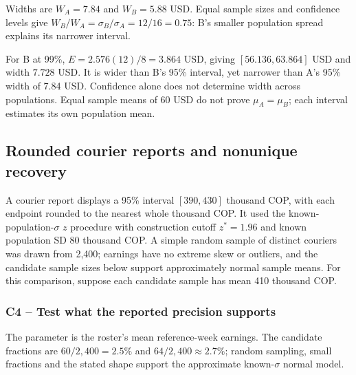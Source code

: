 Widths are $W_A=7.84$ and $W_B=5.88$ USD. Equal sample sizes and confidence levels give $W_B/W_A=\sigma_B/\sigma_A=12/16=0.75$: B's smaller population spread explains its narrower interval.

For B at 99\%, $E=2.576(12)/8=3.864$ USD, giving $[56.136,63.864]$ USD and width $7.728$ USD. It is wider than B's 95\% interval, yet narrower than A's 95\% width of 7.84 USD. Confidence alone does not determine width across populations. Equal sample means of 60 USD do not prove $\mu_A=\mu_B$; each interval estimates its own population mean.

\clearpage
\subsection{Rounded courier reports and nonunique recovery}\label{prob:c4-advanced-2}
A courier report displays a 95\% interval $[390,430]$ thousand COP, with each endpoint rounded to the nearest whole thousand COP. It used the known-population-$\sigma$ $z$ procedure with construction cutoff $z^*=1.96$ and known population SD 80 thousand COP. A simple random sample of distinct couriers was drawn from 2,400; earnings have no extreme skew or outliers, and the candidate sample sizes below support approximately normal sample means. For this comparison, suppose each candidate sample has mean 410 thousand COP.
\subsubsection*{C4 -- Test what the reported precision supports}\label{sol:c4-advanced-2}
The parameter is the roster's mean reference-week earnings. The candidate fractions are $60/2{,}400=2.5\%$ and $64/2{,}400\approx2.7\%$; random sampling, small fractions and the stated shape support the approximate known-$\sigma$ normal model.

